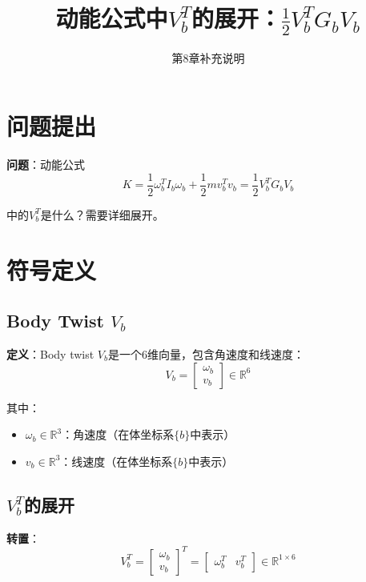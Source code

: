 \documentclass[12pt,a4paper]{article}
\title{动能公式中$V_b^T$的展开：$\frac{1}{2}V_b^T G_b V_b$}
\author{第8章补充说明}
\date{}
\begin{document}
\maketitle

\section{问题提出}

\textbf{问题}：动能公式
\begin{equation}
K = \frac{1}{2}\omega_b^T I_b \omega_b + \frac{1}{2}mv_b^T v_b = \frac{1}{2}V_b^T G_b V_b
\label{eq:kinetic_energy}
\end{equation}

中的$V_b^T$是什么？需要详细展开。

\section{符号定义}

\subsection{Body Twist $V_b$}

\textbf{定义}：Body twist $V_b$是一个6维向量，包含角速度和线速度：
\begin{equation}
V_b = \begin{bmatrix} \omega_b \\ v_b \end{bmatrix} \in \mathbb{R}^6
\label{eq:Vb_definition}
\end{equation}

其中：
\begin{itemize}
\item $\omega_b \in \mathbb{R}^3$：角速度（在体坐标系$\{b\}$中表示）
\item $v_b \in \mathbb{R}^3$：线速度（在体坐标系$\{b\}$中表示）
\end{itemize}

\subsection{$V_b^T$的展开}

\textbf{转置}：
\begin{equation}
V_b^T = \begin{bmatrix} \omega_b \\ v_b \end{bmatrix}^T = \begin{bmatrix} \omega_b^T & v_b^T \end{bmatrix} \in \mathbb{R}^{1 \times 6}
\label{eq:Vb_transpose}
\end{equation}
\end{document}
